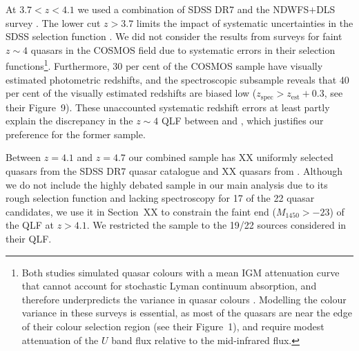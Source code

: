 \documentclass[fleqn,usenatbib]{mnras}
\begin{document}
At $3.7<z<4.1$ we used a combination of SDSS DR7 \citep[XX uniformly
  selected quasars from][]{2010AJ....139.2360S} and the NDWFS$+$DLS
survey \citep{2010ApJ...710.1498G,2011ApJ...728L..26G}. The lower cut
$z>3.7$ limits the impact of systematic uncertainties in the
\citet{2006AJ....131.2766R} SDSS selection function
\citep{2009ApJ...705L.113P, 2011ApJ...728...23W}. We did not consider
the results from surveys for faint $z\sim 4$ quasars in the COSMOS
field \citep{2011ApJ...728L..25I, 2012ApJ...755..169M} due to
systematic errors in their selection functions\footnote{Both studies
  simulated quasar colours with a mean IGM attenuation curve
  \citep{1995ApJ...441...18M} that cannot account for stochastic Lyman
  continuum absorption, and therefore underpredicts the variance in
  quasar colours \citep{1999ApJ...518..103B, 2008MNRAS.387.1681I,
    2011ApJ...728...23W}. Modelling the colour variance in these
  surveys is essential, as most of the \citet{2011ApJ...728L..25I}
  quasars are near the edge of their colour selection region (see
  their Figure~1), and \citet{2012ApJ...755..169M} require modest
  attenuation of the $U$ band flux relative to the mid-infrared
  flux.}. Furthermore, 30 per cent of the \citet{2012ApJ...755..169M}
COSMOS sample have visually estimated photometric redshifts, and the
spectroscopic subsample reveals that 40 per cent of the visually
estimated redshifts are biased low
($z_\mathrm{spec}>z_\mathrm{est}+0.3$, see their Figure~9). These
unaccounted systematic redshift errors at least partly explain the
discrepancy in the $z\sim 4$ QLF between \citet{2011ApJ...728L..26G}
and \citet{2012ApJ...755..169M}, which justifies our preference for
the former sample.

Between $z=4.1$ and $z=4.7$ our combined sample has XX uniformly
selected quasars from the SDSS DR7 quasar catalogue
\citep{2010AJ....139.2360S} and XX quasars from
\citet{2011ApJ...728L..26G}. Although we do not include the highly
debated \citet{2015AA...578A..83G} sample in our main analysis due to
its rough selection function and lacking spectroscopy for 17 of the 22
quasar candidates, we use it in Section~XX to constrain the faint end
($M_{1450}>-23$) of the QLF at $z>4.1$. We restricted the
\citet{2015AA...578A..83G} sample to the 19/22 sources considered in
their QLF.
\end{document}
